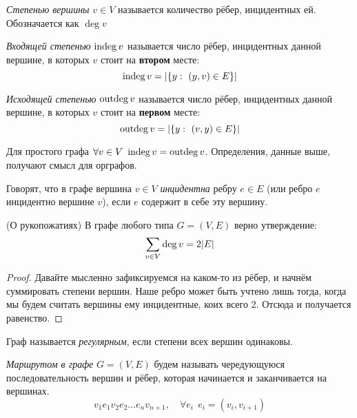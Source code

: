 \begin{multicols}{2}
    \begin{definition}{}{}
      \textit{Степенью вершины} $v \in V$ называется количество рёбер, инцидентных ей. Обозначается как $\deg v$
    \end{definition}
    
    \begin{definition}{}{}
      \textit{Входящей степенью} $\operatorname{indeg} v$ называется число рёбер, инцидентных данной вершине, в которых $v$ стоит на \textbf{втором} месте:
      \[
        \operatorname{indeg} v = |\{y: \  (y, v) \in E\}|
      \]
    \end{definition}
    
    \begin{definition}{}{}
      \textit{Исходящей степенью} $\operatorname{outdeg} v$ называется число рёбер, инцидентных данной вершине, в которых $v$ стоит на \textbf{первом} месте:
      \[
        \operatorname{outdeg} v = |\{y :\  (v, y) \in E\}|
      \]
    \end{definition}
    
    \begin{note}{}{}
      Для простого графа $\forall v \in V\ \operatorname{indeg} v = \operatorname{outdeg} v$. Определения, данные выше, получают смысл для орграфов.
    \end{note}
    
    \begin{definition}{}{}
      Говорят, что в графе вершина $v \in V$ \textit{инцидентна} ребру $e \in E$ (или ребро $e$ инцидентно вершине $v$), если $e$ содержит в себе эту вершину.
    \end{definition}
    
    \begin{lemma}{(О рукопожатиях)}{}
      В графе любого типа $G = (V, E)$ верно утверждение:
      \[
        \sum\limits_{v \in V} \deg v = 2|E|
      \]
    \end{lemma}
    
    \begin{proof}
      Давайте мысленно зафиксируемся на каком-то из рёбер, и начнём суммировать степени вершин. Наше ребро может быть учтено лишь тогда, когда мы будем считать вершины ему инцидентные, коих всего 2. Отсюда и получается равенство.
    \end{proof}
    
    \begin{definition}{}{}
      Граф называется \textit{регулярным}, если степени всех вершин одинаковы.
    \end{definition}
    
    \begin{definition}{}{}
      \textit{Маршрутом в графе} $G = (V, E)$ будем называть чередующуюся последовательность вершин и рёбер, которая начинается и заканчивается на вершинах.
      \[
        v_1 e_1 v_2 e_2 \ldots e_n v_{n + 1}, \quad \forall e_i\ \ e_i = (v_i, v_{i + 1})
      \]
    \end{definition}
    

\end{multicols}
